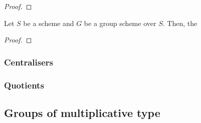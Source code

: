             \begin{lemma} \label{lemma: representability_of_automorphism_groups_of_schemes}
                
            \end{lemma}
                \begin{proof}
                    
                \end{proof}
            \begin{corollary} \label{coro: representability_of_normalisers_and_transporteres}
                Let $S$ be a scheme and $G$ be a group scheme over $S$. Then, the 
            \end{corollary}
                \begin{proof}
                    
                \end{proof}
                
        \subsubsection{Centralisers}
        
        \subsubsection{Quotients}
        
    \subsection{Groups of multiplicative type}
